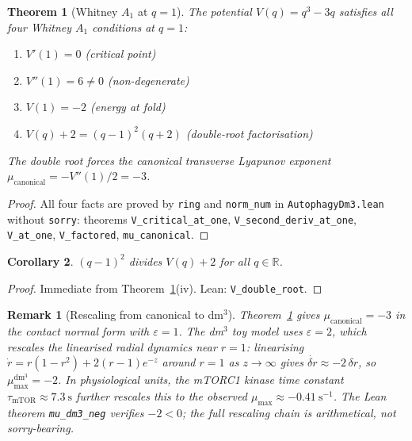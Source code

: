 \documentclass[12pt,a4paper]{article}
\newtheorem{theorem}{Theorem}[section]
\newtheorem{corollary}[theorem]{Corollary}
\newtheorem{remark}{Remark}
\begin{document}
\begin{theorem}[Whitney $A_1$ at $q=1$]
\label{thm:whitney}
The potential $V(q) = q^3 - 3q$ satisfies all four Whitney $A_1$
conditions at $q=1$:
\begin{enumerate}[label=(\roman*),leftmargin=2em]
  \item $V'(1) = 0$ \quad\textup{(critical point)}
  \item $V''(1) = 6 \neq 0$ \quad\textup{(non-degenerate)}
  \item $V(1) = -2$ \quad\textup{(energy at fold)}
  \item $V(q) + 2 = (q-1)^2(q+2)$ \quad\textup{(double-root factorisation)}
\end{enumerate}
The double root forces the canonical transverse Lyapunov exponent
$\mu_\mathrm{canonical} = -V''(1)/2 = -3$.
\end{theorem}

\begin{proof}
All four facts are proved by \texttt{ring} and \texttt{norm\_num} in
\texttt{AutophagyDm3.lean} without \texttt{sorry}: theorems
\texttt{V\_critical\_at\_one}, \texttt{V\_second\_deriv\_at\_one},
\texttt{V\_at\_one}, \texttt{V\_factored}, \texttt{mu\_canonical}.
\end{proof}

\begin{corollary}
\label{cor:doubleroot}
$(q-1)^2$ divides $V(q) + 2$ for all $q \in \mathbb{R}$.
\end{corollary}

\begin{proof}
Immediate from Theorem~\ref{thm:whitney}(iv). Lean:
\texttt{V\_double\_root}.
\end{proof}

\begin{remark}[Rescaling from canonical to dm$^3$]
\label{rem:rescaling}
Theorem~\ref{thm:whitney} gives $\mu_\mathrm{canonical} = -3$ in the
contact normal form with $\varepsilon = 1$.
The dm$^3$ toy model uses $\varepsilon = 2$, which rescales the
linearised radial dynamics near $r = 1$:
linearising $\dot{r} = r(1-r^2) + 2(r-1)e^{-z}$ around $r=1$
as $z \to \infty$ gives $\dot{\delta r} \approx -2\,\delta r$,
so $\mu_{\max}^\mathrm{dm^3} = -2$.
In physiological units, the mTORC1 kinase time constant
$\tau_\mathrm{mTOR} \approx 7.3~\mathrm{s}$ further rescales this to
the observed $\mu_{\max} \approx -0.41~\mathrm{s}^{-1}$.
The Lean theorem \texttt{mu\_dm3\_neg} verifies $-2 < 0$;
the full rescaling chain is arithmetical, not sorry-bearing.
\end{remark}
\end{document}
